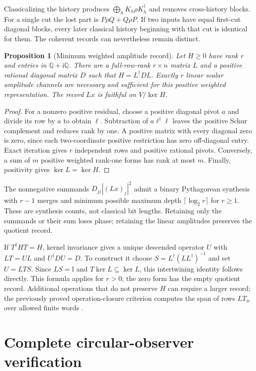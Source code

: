 \documentclass[11pt,a4paper]{article}
\newtheorem{proposition}[theorem]{Proposition}
\newcommand{\adj}{\dagger}
\newcommand{\ii}{\mathrm{i}}
\newcommand{\Id}{\mathbb I}
\begin{document}
Classicalizing the history produces $\bigoplus_h K_h\rho K_h^\adj$ and
removes cross-history blocks. For a single cut the lost part is
$P\rho Q+Q\rho P$. If two inputs have equal first-cut diagonal blocks,
every later classical history beginning with that cut is identical for
them. The coherent records can nevertheless remain distinct.

\begin{proposition}[Minimum weighted amplitude record]\label{thm:factor}
Let $H\geq0$ have rank $r$ and entries in $\mathbb Q+\ii\mathbb Q$. There
are a full-row-rank $r\times n$ matrix $L$ and a positive rational diagonal
matrix $D$ such that $H=L^\adj DL$. Exactly $r$ linear scalar amplitude
channels are necessary and sufficient for this positive weighted
representation. The record $Lx$ is faithful on $V/\ker H$.
\end{proposition}
\begin{proof}
For a nonzero positive residual, choose a positive diagonal pivot $a$ and
divide its row by $a$ to obtain $\ell$. Subtraction of
$a\ell^\adj\ell$ leaves the positive Schur complement and reduces rank
by one. A positive matrix with every diagonal zero is zero, since each
two-coordinate positive restriction has zero off-diagonal entry. Exact
iteration gives $r$ independent rows and positive rational pivots.
Conversely, a sum of $m$ positive weighted rank-one forms has rank at most
$m$. Finally, positivity gives $\ker L=\ker H$.
\end{proof}

The nonnegative summands $D_{jj}|(Lx)_j|^2$ admit a binary Pythagorean
synthesis with $r-1$ merges and minimum possible maximum depth
$\lceil\log_2 r\rceil$ for $r\geq1$. These are synthesis counts, not
classical bit lengths. Retaining only the summands or their sum loses
phase; retaining the linear amplitudes preserves the quotient record.

If $T^\adj HT=H$, kernel invariance gives a unique descended operator $U$
with $LT=UL$ and $U^\adj DU=D$. To construct it choose
$S=L^\adj(LL^\adj)^{-1}$ and set $U=LTS$. Since $LS=\Id$ and
$T\ker L\subseteq\ker L$, this intertwining identity follows directly.
This formula applies for $r>0$; the zero form has the empty quotient record.
Additional operations that do not preserve $H$ can require a larger record;
the previously proved operation-closure criterion computes the span of
rows $LT_w$ over allowed finite words \cite{crc,chd}.

\section{Complete circular-observer verification}
\end{document}
